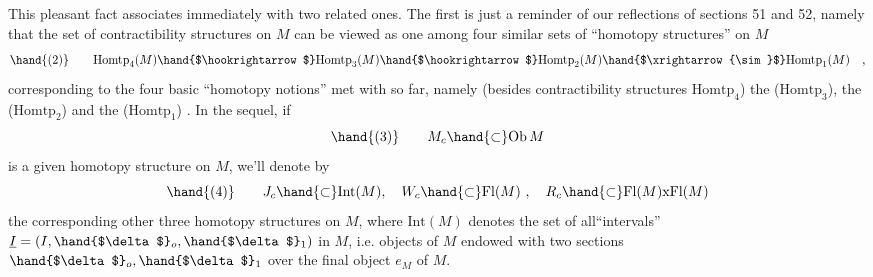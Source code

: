 This pleasant fact associates immediately with two related
ones. The first is just a reminder of our reflections of sections 51 and
52, namely that the set of contractibility structures on $M$ can be viewed
as one among four similar sets of ``homotopy structures'' on $M$
\[ \hand{(2)} \qquad \mathrm{Homtp}_4(M) \hand{$\hookrightarrow$} \mathrm{Homtp}_3(M) \hand{$\hookrightarrow$} \mathrm{Homtp}_2(M) \hand{$\xrightarrow{\sim}$} \mathrm{Homtp}_1(M) \quad , \]
corresponding to the four  basic ``homotopy notions'' met with so far,
namely (besides contractibility structures $\mathrm{Homtp}_4$) the  \hand{\uline{\textcolor{black}{homotopy
interval structures}}} ($\mathrm{Homtp}_3$), the \hand{\uline{\textcolor{black}{homotopism structures}}}  ($\mathrm{Homtp}_2$) and
the \hand{\uline{\textcolor{black}{homotopy relations}}}  ($\mathrm{Homtp}_1$) . In the sequel, if 
\[ \hand{(3)} \qquad M_c \hand{\subset} \mathrm{Ob}\, M \]
is a given homotopy structure on $M$, we'll denote by 
\[ \hand{(4)} \qquad J_c \hand{\subset} \mathrm{Int}(M), \quad W_c \hand{\subset} \mathrm{Fl}(M) \ , \quad R_c \hand{\subset} \mathrm{Fl}(M)\text{x}\mathrm{Fl}(M) \]
the corresponding other three homotopy structures on $M$, where $\mathrm{Int}(M)$
denotes the set of all``intervals'' $\underline{I} = (I, \hand{$\delta$}_o, \hand{$\delta$}_1)$ in $M$, i.e. objects of
$M$ endowed with two sections $\hand{$\delta$}_o,\hand{$\delta$}_1$ over the final object $e_M$ of $M$.

